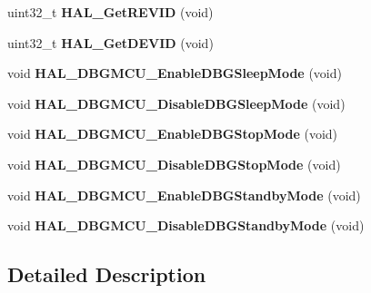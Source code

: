 \begin{DoxyCompactItemize}
\item 
\hypertarget{group___h_a_l___exported___functions___group2_gae051ef9e932404b21f5877c7186406b8}{uint32\-\_\-t {\bfseries H\-A\-L\-\_\-\-Get\-R\-E\-V\-I\-D} (void)}\label{group___h_a_l___exported___functions___group2_gae051ef9e932404b21f5877c7186406b8}

\item 
\hypertarget{group___h_a_l___exported___functions___group2_gaff785f069ed650de77ff82ac407f7c84}{uint32\-\_\-t {\bfseries H\-A\-L\-\_\-\-Get\-D\-E\-V\-I\-D} (void)}\label{group___h_a_l___exported___functions___group2_gaff785f069ed650de77ff82ac407f7c84}

\item 
\hypertarget{group___h_a_l___exported___functions___group2_gaf031bcc71ebad9b7edf405547efd762b}{void {\bfseries H\-A\-L\-\_\-\-D\-B\-G\-M\-C\-U\-\_\-\-Enable\-D\-B\-G\-Sleep\-Mode} (void)}\label{group___h_a_l___exported___functions___group2_gaf031bcc71ebad9b7edf405547efd762b}

\item 
\hypertarget{group___h_a_l___exported___functions___group2_gac7820d0561f19999a68d714655b901b5}{void {\bfseries H\-A\-L\-\_\-\-D\-B\-G\-M\-C\-U\-\_\-\-Disable\-D\-B\-G\-Sleep\-Mode} (void)}\label{group___h_a_l___exported___functions___group2_gac7820d0561f19999a68d714655b901b5}

\item 
\hypertarget{group___h_a_l___exported___functions___group2_gadf25043b17de4bef38a95a75fd03e5c4}{void {\bfseries H\-A\-L\-\_\-\-D\-B\-G\-M\-C\-U\-\_\-\-Enable\-D\-B\-G\-Stop\-Mode} (void)}\label{group___h_a_l___exported___functions___group2_gadf25043b17de4bef38a95a75fd03e5c4}

\item 
\hypertarget{group___h_a_l___exported___functions___group2_ga2c93dcee35e5983d74f1000de7c042d5}{void {\bfseries H\-A\-L\-\_\-\-D\-B\-G\-M\-C\-U\-\_\-\-Disable\-D\-B\-G\-Stop\-Mode} (void)}\label{group___h_a_l___exported___functions___group2_ga2c93dcee35e5983d74f1000de7c042d5}

\item 
\hypertarget{group___h_a_l___exported___functions___group2_ga28a1323b2eeb0a408c1cfdbfa0db5ead}{void {\bfseries H\-A\-L\-\_\-\-D\-B\-G\-M\-C\-U\-\_\-\-Enable\-D\-B\-G\-Standby\-Mode} (void)}\label{group___h_a_l___exported___functions___group2_ga28a1323b2eeb0a408c1cfdbfa0db5ead}

\item 
\hypertarget{group___h_a_l___exported___functions___group2_ga7faa58d8508ea3123b9f247a70379779}{void {\bfseries H\-A\-L\-\_\-\-D\-B\-G\-M\-C\-U\-\_\-\-Disable\-D\-B\-G\-Standby\-Mode} (void)}\label{group___h_a_l___exported___functions___group2_ga7faa58d8508ea3123b9f247a70379779}

\end{DoxyCompactItemize}


\subsection{Detailed Description}
